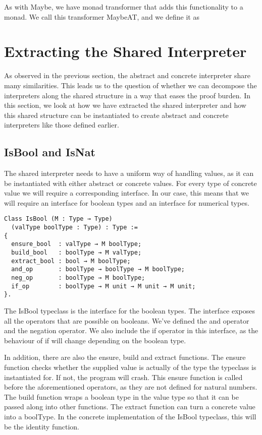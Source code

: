 {As with Maybe, we have monad transformer that adds this functionality to a
monad. We call this transformer MaybeAT, and we define it as \\

\section{Extracting the Shared Interpreter}\label{sec:shared_interpreter}
As observed in the previous section, the abstract and concrete interpreter
share many similarities. This leads us to the question of whether we can
decompose the interpreters along the shared structure in a way that eases the
proof burden. In this section, we look at how we have extracted the shared
interpreter and how this shared structure can be instantiated to create
abstract and concrete interpreters like those defined earlier.

\subsection{IsBool and IsNat}
The shared interpreter needs to have a uniform way of handling values, as it
can be instantiated with either abstract or concrete values. For every type of
concrete value we will require a corresponding interface. In our case, this
means that we will require an interface for boolean types and an interface for
numerical types.

\begin{verbatim}
Class IsBool (M : Type → Type)
  (valType boolType : Type) : Type :=
{
  ensure_bool  : valType → M boolType;
  build_bool   : boolType → M valType;
  extract_bool : bool → M boolType;
  and_op       : boolType → boolType → M boolType;
  neg_op       : boolType → M boolType;
  if_op        : boolType → M unit → M unit → M unit;
}.
\end{verbatim}

The IsBool typeclass is the interface for the boolean types. The interface
exposes all the operators that are possible on booleans. We've defined the and
operator and the negation operator. We also include the if operator in this
interface, as the behaviour of if will change depending on the boolean type. 

In addition, there are also the ensure, build and extract functions. The ensure
function checks whether the supplied value is actually of the type the
typeclass is instantiated for. If not, the program will crash. This ensure
function is called before the aforementioned operators, as they are not defined
for natural numbers. The build function wraps a boolean type in the value type
so that it can be passed along into other functions. The extract function can
turn a concrete value into a boolType. In the concrete implementation
of the IsBool typeclass, this will be the identity function.

}

